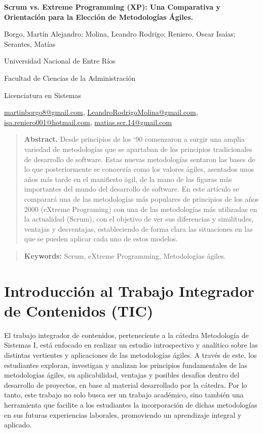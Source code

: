 \documentclass[a4paper,10pt]{article}
\begin{document}
	\centering
	{\fontsize{14}{17}\bfseries Scrum vs. Extreme Programming (XP): Una Comparativa y Orientación para la Elección de Metodologías Ágiles.\par}
	{\small Borgo, Martín Alejandro; Molina, Leandro Rodrigo; Reniero, Oscar Isaías; Serantes, Matías\par}
	{\normalsize Universidad Nacional de Entre Ríos\par}
	{\normalsize Facultad de Ciencias de la Administración\par}
	{\normalsize Licenciatura en Sistemas\par}
	{\small \href{mailto:martinborgo8@gmail.com}{martinborgo8@gmail.com},
	\href{mailto:LeandroRodrigoMolina@gmail.com}{LeandroRodrigoMolina@gmail.com}, \href{mailto:isa.reniero001@hotmail.com}{isa.reniero001@hotmail.com},
	\href{mailto:matias.ser.14@gmail.com}{matias.ser.14@gmail.com}
	\par}	
	{\begin{quote} \small \justify\textbf{Abstract.} Desde principios de los ‘90 comenzaron a surgir una amplia variedad de metodologías que se apartaban de los principios tradicionales de desarrollo de software. Estas nuevas metodologías sentaron las bases de lo que posteriormente se conocería como los valores ágiles, asentados unos años más tarde en el manifiesto ágil, de la mano de las figuras más importantes del mundo del desarrollo de software. En este artículo se comparará una de las metodologías más populares de principios de los años 2000 (eXtreme Programing) con una de las metodologías más utilizadas en la actualidad (Scrum), con el objetivo de ver sus diferencias y similitudes, ventajas y desventajas, estableciendo de forma clara las situaciones en las que se pueden aplicar cada uno de estos modelos. \end{quote} \par}
	{\begin{quote} \small \justify\textbf{Keywords:} Scrum, eXtreme Programming, Metodologías ágiles. \end{quote} \par}
	
	\justifying
	
	\section{Introducción al Trabajo Integrador de Contenidos (TIC)}
	El trabajo integrador de contenidos, perteneciente a la cátedra Metodología de Sistemas I, está enfocado en realizar un estudio introspectivo y analítico sobre las distintas vertientes y aplicaciones de las metodologías ágiles. A través de este, los estudiantes exploran, investigan y analizan los principios fundamentales de las metodologías ágiles, su aplicabilidad, ventajas y posibles desafíos dentro del desarrollo de proyectos, en base al material desarrollado por la cátedra. Por lo tanto, este trabajo no solo busca ser un trabajo académico, sino también una herramienta que facilite a los estudiantes la incorporación de dichas metodologías en sus futuras experiencias laborales, promoviendo un aprendizaje integral y aplicado.
\end{document}
